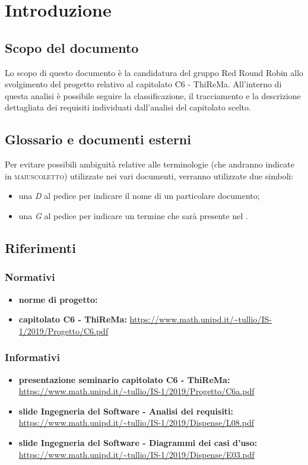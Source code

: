 \section{Introduzione}
	\subsection{Scopo del documento}
		Lo scopo di questo documento è la candidatura del gruppo Red Round Robin allo svolgimento del progetto relativo al capitolato C6 - ThiReMa.
		All'interno di questa analisi è  possibile seguire la classificazione, il tracciamento e la descrizione dettagliata dei requisiti individuati dall'analisi del capitolato scelto.
	\subsection{Glossario e documenti esterni}
		Per evitare possibili ambiguità relative alle terminologie (che andranno indicate in \textsc{maiuscoletto}) utilizzate nei vari documenti, verranno utilizzate due simboli:
		\begin{itemize}
			\item una \textit{D} al pedice per indicare il nome di un particolare documento;
			\item una \textit{G} al pedice per indicare un termine che sarà presente nel .
		\end{itemize}
	\subsection{Riferimenti}
		\subsubsection{Normativi}
			\begin{itemize}
				\item \textbf{norme di progetto: } 
				\item \textbf{capitolato C6 - ThiReMa: }\url{https://www.math.unipd.it/~tullio/IS-1/2019/Progetto/C6.pdf}
			\end{itemize}
		\subsubsection{Informativi}
			\begin{itemize}
				\item \textbf{presentazione seminario capitolato C6 - ThiReMa: }\url{https://www.math.unipd.it/~tullio/IS-1/2019/Progetto/C6a.pdf}
				\item \textbf{slide Ingegneria del Software - Analisi dei requisiti: }\url{https://www.math.unipd.it/~tullio/IS-1/2019/Dispense/L08.pdf}
				\item \textbf{slide Ingegneria del Software - Diagrammi dei casi d'uso: }\url{https://www.math.unipd.it/~tullio/IS-1/2019/Dispense/E03.pdf} 
			\end{itemize}
 